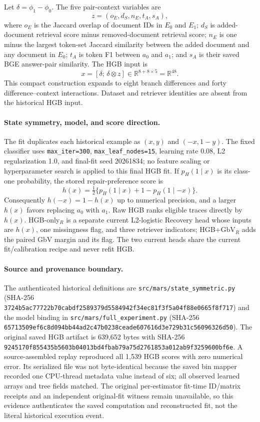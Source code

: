 \documentclass[10pt]{article}
\begin{document}
Let $\delta=\phi_1-\phi_0$. The five pair-context variables are
\[
 z=(o_E,d_S,n_E,t_A,s_A),
\]
where $o_E$ is the Jaccard overlap of document IDs in $E_0$ and $E_1$; $d_S$ is added-document retrieval score minus removed-document retrieval score; $n_E$ is one minus the largest token-set Jaccard similarity between the added document and any document in $E_0$; $t_A$ is token F1 between $a_0$ and $a_1$; and $s_A$ is their saved BGE answer-pair similarity. The HGB input is
\[
 x=[\delta;\,\delta\otimes z]\in\mathbb{R}^{8+8\times5}=\mathbb{R}^{48}.
\]
This compact construction expands to eight branch differences and forty difference--context interactions. Dataset and retriever identities are absent from the historical HGB input.

\paragraph{State symmetry, model, and score direction.}
The fit duplicates each historical example as $(x,y)$ and $(-x,1-y)$. The fixed classifier uses \texttt{max\_iter=300}, \texttt{max\_leaf\_nodes=15}, learning rate 0.08, L2 regularization 1.0, and final-fit seed 20261834; no feature scaling or hyperparameter search is applied to this final HGB fit. If $p_H(1\mid x)$ is its class-one probability, the stored repair-preference score is
\[
 h(x)=\tfrac12\{p_H(1\mid x)+1-p_H(1\mid -x)\}.
\]
Consequently $h(-x)=1-h(x)$ up to numerical precision, and a larger $h(x)$ favors replacing $a_0$ with $a_1$. Raw HGB ranks eligible traces directly by $h(x)$. HGB-only$_R$ is a separate current L2-logistic Recovery head whose inputs are $h(x)$, one missingness flag, and three retriever indicators; HGB+GbV$_R$ adds the paired GbV margin and its flag. The two current heads share the current fit/calibration recipe and never refit HGB.

\paragraph{Source and provenance boundary.}
The authenticated historical definitions are \texttt{src/mars/state\_symmetric.py} (SHA-256 \nolinkurl{3724b5ac77722b70cabdf2589379d5584942f34ec81f3f5a04f88e0665f8f717}) and the model binding in \texttt{src/mars/full\_experiment.py} (SHA-256 \nolinkurl{65713509ef6c8d094bb44ad2c47b0238ceade607616d3e729b31c56096326d50}). The original saved HGB artifact is 639,652 bytes with SHA-256 \nolinkurl{9245170f855435b5603b04013bd4fbab79a75d2761853a012ab9f3259600bf6e}. A source-assembled replay reproduced all 1,539 HGB scores with zero numerical error. Its serialized file was not byte-identical because the saved bin mapper recorded one CPU-thread metadata value instead of six; all observed learned arrays and tree fields matched. The original per-estimator fit-time ID/matrix receipts and an independent original-fit witness remain unavailable, so this evidence authenticates the saved computation and reconstructed fit, not the literal historical execution event.
\end{document}
